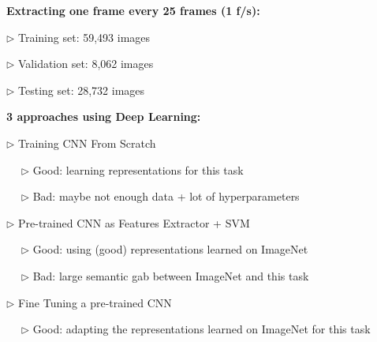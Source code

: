 \documentclass[landscape,a0paper,fontscale=0.292]{baposter}
\begin{document}
\begin{poster}
{\textbf{Extracting one frame every 25 frames (1 f/s):}

$\triangleright$ Training set: 59,493 images

$\triangleright$ Validation set: 8,062 images

$\triangleright$ Testing set: 28,732 images

\vspace{-2mm}


\textbf{3 approaches using Deep Learning:}

$\triangleright$ Training CNN From Scratch

~~ $\triangleright$ Good: learning representations for this task

~~ $\triangleright$ Bad: maybe not enough data + lot of hyperparameters

$\triangleright$ Pre-trained CNN as Features Extractor + SVM

~~ $\triangleright$ Good: using (good) representations learned on ImageNet 

~~ $\triangleright$ Bad: large semantic gab between ImageNet and this task

$\triangleright$ Fine Tuning a pre-trained CNN 

~~ $\triangleright$ Good: adapting the representations learned on ImageNet for this task

}


\end{poster}
\end{document}

